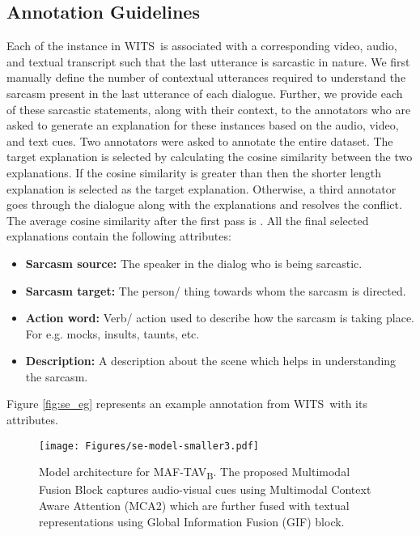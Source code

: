\documentclass[11pt]{article}
\newcommand{\dataset}{\textsc{WITS}}
\newcommand{\modelTAV}{\textsc{MAF-TAV\textsubscript{B}}}
\begin{document}
\subsection{Annotation Guidelines}
\label{sec:app_annot}
Each of the instance in \dataset\
is associated with a corresponding video, audio, and textual transcript such that the last utterance is sarcastic in nature. We first manually define the number of contextual utterances required to understand the sarcasm present in the last utterance of each dialogue. Further, we provide each of these sarcastic statements, along with their context, to the annotators who are asked to generate an explanation for these instances based on the audio, video, and text cues. Two annotators were asked to annotate the entire dataset. The target explanation is selected by calculating the cosine similarity between the two explanations. If the cosine similarity is greater than  then the shorter length explanation is selected as the target explanation. Otherwise, a third annotator goes through the dialogue along with the explanations and resolves the conflict. The average cosine similarity after the first pass is . All the final selected explanations contain the following attributes:
\begin{itemize}[leftmargin=*,topsep=0pt]
    \setlength{\itemsep}{0pt}
    \setlength{\parskip}{0pt}
    \setlength{\parsep}{0pt}
        \item {\bf Sarcasm source:} The speaker in the dialog who is being sarcastic.
        \item {\bf Sarcasm target:} The person/ thing towards whom the sarcasm is directed.
        \item {\bf Action word:} Verb/ action used to describe how the sarcasm is taking place. For e.g. mocks, insults, taunts, etc.
        \item {\bf Description:} A description about the scene which helps in understanding the sarcasm.
\end{itemize}
Figure \ref{fig:se_eg} represents an example annotation from \dataset\ with its attributes.

\begin{figure*}[h!]
    \centering
    \texttt{[image: Figures/se-model-smaller3.pdf]}
    \caption{Model architecture for \modelTAV. The proposed Multimodal Fusion Block captures audio-visual cues using Multimodal Context Aware Attention (MCA2) which are further fused with textual representations using Global Information Fusion (GIF) block.}
    \label{fig:model_arch}
\end{figure*}
\end{document}

